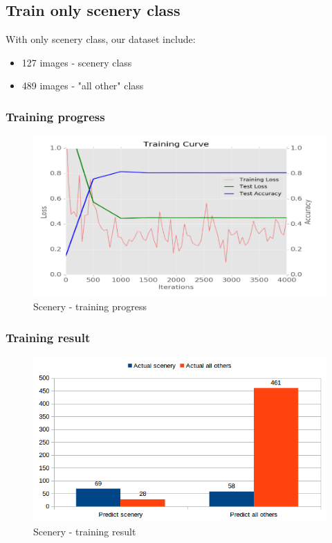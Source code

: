 \documentclass[11pt]{article}
\begin{document}
\subsection{Train only scenery class}
With only scenery class, our dataset include: 
\begin{itemize}
\item 127 images - scenery class
\item 489 images - "all other" class
\end{itemize}

\subsubsection{Training progress}

\begin{figure}[H]
\centering
\includegraphics[width=1\textwidth]{images/train_only_scenery}
\caption{Scenery - training progress}
\end{figure}

\subsubsection{Training result}

\begin{figure}[H]
\centering
\includegraphics[width=1\textwidth]{images/scenery}
\caption{Scenery - training result}
\end{figure}
\end{document}
